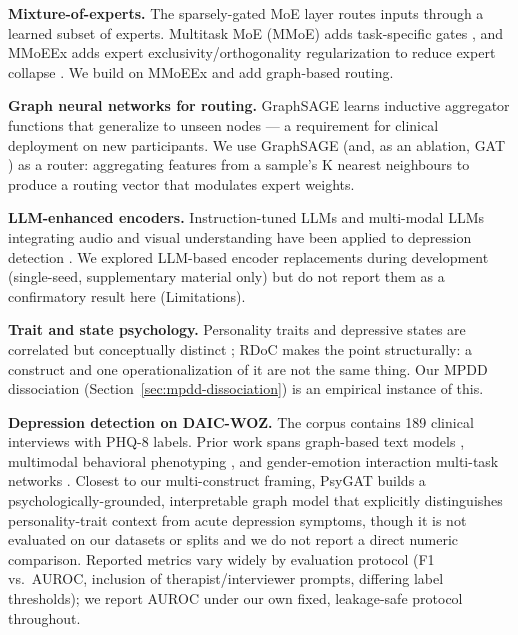 \documentclass[letterpaper]{article}
\begin{document}
\textbf{Mixture-of-experts.} The sparsely-gated MoE layer \citep{shazeer2017moe} routes inputs through a learned subset of experts. Multitask MoE (MMoE) adds task-specific gates \citep{ma2018model}, and MMoEEx adds expert exclusivity/orthogonality regularization to reduce expert collapse \citep{aoki2021mmoeex}. We build on MMoEEx and add graph-based routing.

\textbf{Graph neural networks for routing.} GraphSAGE \citep{graphsage2017inductive} learns inductive aggregator functions that generalize to unseen nodes — a requirement for clinical deployment on new participants. We use GraphSAGE (and, as an ablation, GAT \citep{gat2018attention}) as a router: aggregating features from a sample's K nearest neighbours to produce a routing vector that modulates expert weights.

\textbf{LLM-enhanced encoders.} Instruction-tuned LLMs and multi-modal LLMs integrating audio and visual understanding have been applied to depression detection \citep{zhao2025multimodalllm}. We explored LLM-based encoder replacements during development (single-seed, supplementary material only) but do not report them as a confirmatory result here (Limitations).


\textbf{Trait and state psychology.} Personality traits and depressive states are correlated but conceptually distinct \citep{clark1991tripartite,kotov2010linking,bylsma2008differential}; RDoC \citep{insel2010rdoc} makes the point structurally: a construct and one operationalization of it are not the same thing. Our MPDD dissociation (Section~\ref{sec:mpdd-dissociation}) is an empirical instance of this.

\textbf{Depression detection on DAIC-WOZ.} The corpus \citep{gratch2014distress} contains 189 clinical interviews with PHQ-8 labels. Prior work spans graph-based text models \citep{burdisso2024gcndp}, multimodal behavioral phenotyping \citep{chen2026multimodal}, and gender-emotion interaction multi-task networks \citep{xing2026gender}. Closest to our multi-construct framing, PsyGAT \citep{vyalla2026psygat} builds a psychologically-grounded, interpretable graph model that explicitly distinguishes personality-trait context from acute depression symptoms, though it is not evaluated on our datasets or splits and we do not report a direct numeric comparison. Reported metrics vary widely by evaluation protocol (F1 vs.\ AUROC, inclusion of therapist/interviewer prompts, differing label thresholds); we report AUROC under our own fixed, leakage-safe protocol throughout.
\end{document}
